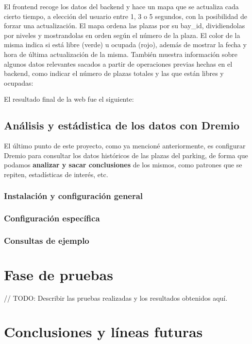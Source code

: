 \documentclass{../../../miPlantilla}
\begin{document}
El frontend recoge los datos del backend y hace un mapa que se actualiza cada cierto tiempo, a elección del usuario entre 1, 3 o 5 segundos,
con la posibilidad de forzar una actualización. El mapa ordena las plazas por su bay\_id, dividiendolas por niveles y mostrandolas en orden 
según el número de la plaza. El color de la misma indica si está libre (verde) u ocupada (rojo), además de mostrar la fecha y hora de
última actualización de la misma. También muestra información sobre algunos datos relevantes sacados a partir de operaciones previas
hechas en el backend, como indicar el número de plazas totales y las que están libres y ocupadas:

El resultado final de la web fue el siguiente:

\newpage

\subsection{Análisis y estádistica de los datos con Dremio}
El último punto de este proyecto, como ya mencioné anteriormente, es configurar Dremio para consultar los datos históricos de las plazas del parking, de forma que
podamos \textbf{analizar y sacar conclusiones} de los mismos, como patrones que se repiten, estadísticas de interés, etc. 

\subsubsection{Instalación y configuración general}

\subsubsection{Configuración específica}

\subsubsection{Consultas de ejemplo}
\section{Fase de pruebas}
// TODO: Describir las pruebas realizadas y los resultados obtenidos aquí.

\section{Conclusiones y líneas futuras}
\end{document}
